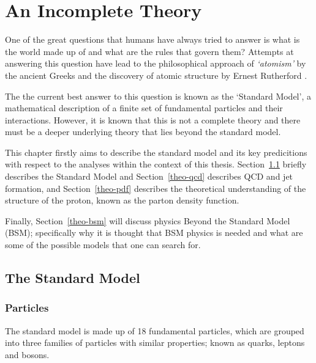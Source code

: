 \chapter{An Incomplete Theory}
\label{sec:theory}

One of the great questions that humans have always tried to answer is
what is the world made up of and what are the rules that govern them?
Attempts at answering this question have lead to the
philosophical approach of \textit{`atomism'} by the ancient Greeks \cite{theo-atomism}
and the discovery of atomic structure by Ernest Rutherford \cite{theo-rutherford}.

The the current best answer to this question is known as the `Standard Model',
a mathematical description of a finite set of fundamental particles and their interactions.
However, it is known that this is not a complete theory and there must be
a deeper underlying theory that lies beyond the standard model.

This chapter firstly aims to describe the standard model and its key predicitions
with respect to the analyses within the context of this thesis.
Section~\ref{theo-sm} briefly describes the Standard Model and
Section~\ref{theo-qcd} describes QCD and jet formation,
and Section~\ref{theo-pdf} describes the theoretical understanding
of the structure of the proton, known as the parton density function.

Finally, Section~\ref{theo-bsm} will discuss physics Beyond the Standard Model (BSM);
specifically why it is thought that BSM physics is needed
and what are some of the possible models that one can search for.

\section{The Standard Model}
\label{theo-sm}

\subsection{Particles}

The standard model is made up of 18 fundamental particles,
which are grouped into three families of particles with similar properties;
known as quarks, leptons and bosons.

